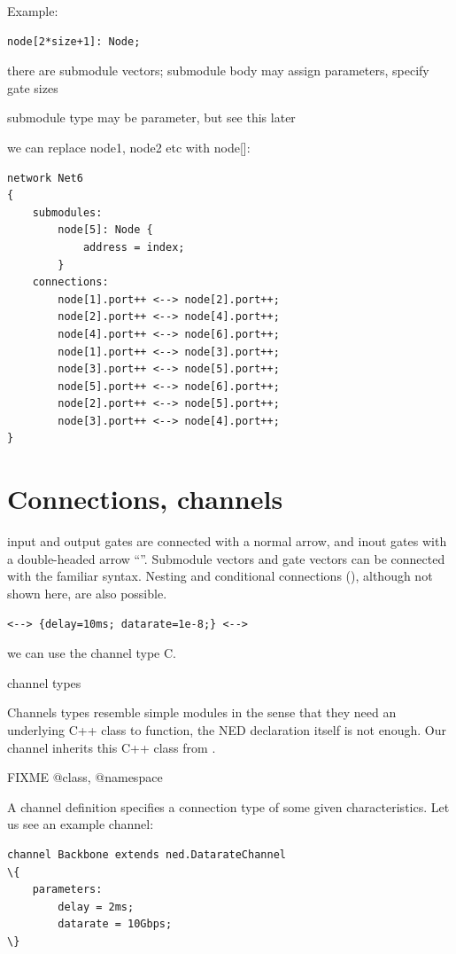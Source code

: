 Example:

\begin{Verbatim}[commandchars=\\\{\}]
    node[2*size+1]: Node;
\end{Verbatim}

there are submodule vectors;
submodule body may assign parameters, specify gate sizes

submodule type may be parameter, but see this later

we can replace node1, node2 etc with node[]:

\begin{Verbatim}
network Net6
{
    submodules:
        node[5]: Node {
            address = index;
        }
    connections:
        node[1].port++ <--> node[2].port++;
        node[2].port++ <--> node[4].port++;
        node[4].port++ <--> node[6].port++;
        node[1].port++ <--> node[3].port++;
        node[3].port++ <--> node[5].port++;
        node[5].port++ <--> node[6].port++;
        node[2].port++ <--> node[5].port++;
        node[3].port++ <--> node[4].port++;
}
\end{Verbatim}


\section{Connections, channels}

input and output gates are connected with a normal arrow, and inout gates
with a double-headed arrow ``\ttt{<-->}''. Submodule vectors and gate
vectors can be connected with the familiar  syntax. Nesting and
conditional connections (), although not shown here, are also
possible.

\begin{Verbatim}
<--> {delay=10ms; datarate=1e-8;} <-->
\end{Verbatim}

we can use the channel type C.

channel types

Channels types resemble simple modules in the sense that they need an underlying
C++ class to function, the NED declaration itself is not enough. Our
 channel inherits this C++ class from .

FIXME @class, @namespace

A channel definition specifies a connection type of some given characteristics.
Let us see an example channel:

\begin{Verbatim}[commandchars=\\\{\}]
channel Backbone extends ned.DatarateChannel
\{
    parameters:
        delay = 2ms;
        datarate = 10Gbps;
\}
\end{Verbatim}

